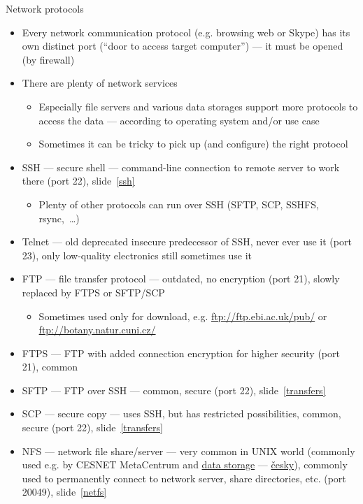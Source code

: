 \documentclass[compress, ucs, xelatex, 11pt, xcolor=svgnames, aspectratio=169,
	hyperref={
		bookmarks=true,
		unicode=true,
		colorlinks=true,
		pdftitle={Linux, command line and MetaCentrum},
		plainpages=false,
		pdfauthor={Vojtech Zeisek},
		pdfsubject={Course about use of Linux command line, writing shell scripts and using MetaCentrum of CESNET},
		pdfcreator={XeLaTeX},
		pdfkeywords={Linux, GNU, BASH, shell, command line, MetaCentrum},
		linkcolor=DarkRed, %
		anchorcolor=DarkBlue, %
		citecolor=Indigo, %
		filecolor=NavyBlue, %
		menucolor=DarkMagenta, %
		urlcolor=DarkBlue, %
		pdftex},
	url={hyphens, lowtilde} %
	]{beamer}
\begin{document}
\begin{frame}[allowframebreaks]{Network protocols}
	\begin{itemize}
		\item Every network communication protocol (e.g. browsing web or Skype) has its own distinct port (\enquote{door to access target computer}) --- it must be opened (by firewall)
		\item There are plenty of network services
		\begin{itemize}
			\item Especially file servers and various data storages support more protocols to access the data --- according to operating system and/or use case
			\item Sometimes it can be tricky to pick up (and configure) the right protocol
		\end{itemize}
		\item SSH --- secure shell --- command-line connection to remote server to work there (port 22), slide~\ref{ssh}
		\begin{itemize}
			\item Plenty of other protocols can run over SSH (SFTP, SCP, SSHFS, rsync,~\ldots)
		\end{itemize}
		\item Telnet --- old deprecated insecure predecessor of SSH, never ever use it (port 23), only low-quality electronics still sometimes use it
		\item FTP --- file transfer protocol --- outdated, no encryption (port 21), slowly replaced by FTPS or SFTP/SCP
		\begin{itemize}
			\item Sometimes used only for download, e.g. \url{ftp://ftp.ebi.ac.uk/pub/} or \url{ftp://botany.natur.cuni.cz/}
		\end{itemize}
		\item FTPS --- FTP with added connection encryption for higher security (port 21), common
		\item SFTP --- FTP over SSH --- common, secure (port 22), slide~\ref{transfers}
		\item SCP --- secure copy --- uses SSH, but has restricted possibilities, common, secure (port 22), slide~\ref{transfers}
		\item NFS --- network file share/server --- very common in UNIX world (commonly used e.g. by CESNET MetaCentrum and \href{https://du.cesnet.cz/en/navody/nfs/start}{data storage} --- \href{https://du.cesnet.cz/cs/navody/nfs/start}{česky}), commonly used to permanently connect to network server, share directories, etc. (port 20049), slide~\ref{netfs}

\end{itemize}
\end{frame}
\end{document}
